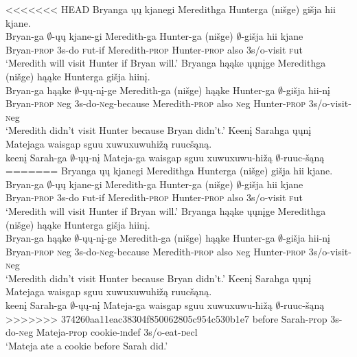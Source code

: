 \documentclass[output=paper]{LSP/langsci}
\begin{document}
\begin{exe}
\ex
\begin{xlist}
\ex
<<<<<<< HEAD
\glll Bryanga ųų kjanegi Meredithga Hunterga (nišge) {gišja hii} kjane.\\
Bryan-ga $\emptyset$-ųų kjane-gi Meredith-ga Hunter-ga (nišge) $\emptyset$-{gišja hii} kjane\\
Bryan-\textsc{prop} {\textsc 3s}-do {\textsc fut}-if Meredith-\textsc{prop} Hunter-\textsc{prop} also {\textsc 3s/o}-visit {\textsc fut}\\
\trans `Meredith will visit Hunter if Bryan will.'
\ex
\glll Bryanga hąąke ųųnįge Meredithga (nišge) hąąke Hunterga {gišja hiinį}.\\
Bryan-ga hąąke $\emptyset$-ųų-nį-ge Meredith-ga (nišge) hąąke Hunter-ga $\emptyset$-{gišja hii-nį}\\
Bryan-\textsc{prop} {\textsc neg} {\textsc 3s}-do-{\textsc neg}-because Meredith-\textsc{prop} also {\textsc neg} Hunter-\textsc{prop} {\textsc 3s/o}-visit-{\textsc neg}\\
\trans `Meredith didn't visit Hunter because Bryan didn't.'
\ex
\glll Keenį Sarahga ųųnį Matejaga {waisgap sguu xuwuxuwuhižą} ruucšąną.\\
keenį Sarah-ga $\emptyset$-ųų-nį Mateja-ga {waisgap sguu xuwuxuwu-hižą} $\emptyset$-ruuc-šąną\\
=======
\glll Bryanga \k{u}\k{u} kjanegi Meredithga Hunterga (ni\v{s}ge) {gi\v{s}ja hii} kjane.\\
Bryan-ga $\emptyset$-\k{u}\k{u} kjane-gi Meredith-ga Hunter-ga (ni\v{s}ge) $\emptyset$-{gi\v{s}ja hii} kjane\\
Bryan-\textsc{prop} {\textsc 3s}-do {\textsc fut}-if Meredith-\textsc{prop} Hunter-\textsc{prop} also {\textsc 3s/o}-visit {\textsc fut}\\
\trans `Meredith will visit Hunter if Bryan will.'
\ex
\glll Bryanga h\k{a}\k{a}ke \k{u}\k{u}n\k{i}ge Meredithga (ni\v{s}ge) h\k{a}\k{a}ke Hunterga {gi\v{s}ja hiin\k{i}}.\\
Bryan-ga h\k{a}\k{a}ke $\emptyset$-\k{u}\k{u}-n\k{i}-ge Meredith-ga (ni\v{s}ge) h\k{a}\k{a}ke Hunter-ga $\emptyset$-{gi\v{s}ja hii-n\k{i}}\\
Bryan-\textsc{prop} {\textsc neg} {\textsc 3s}-do-{\textsc neg}-because Meredith-\textsc{prop} also {\textsc neg} Hunter-\textsc{prop} {\textsc 3s/o}-visit-{\textsc neg}\\
\trans `Meredith didn't visit Hunter because Bryan didn't.'
\ex
\glll Keen\k{i} Sarahga \k{u}\k{u}n\k{i} Matejaga {waisgap sguu xuwuxuwuhi\v{z}\k{a}} ruuc\v{s}\k{a}n\k{a}.\\
keen\k{i} Sarah-ga $\emptyset$-\k{u}\k{u}-n\k{i} Mateja-ga {waisgap sguu xuwuxuwu-hi\v{z}\k{a}} $\emptyset$-ruuc-\v{s}\k{a}n\k{a}\\
>>>>>>> 374260aa11eac38304f850062805c954c530b1e7
before Sarah-{\textsc prop} {\textsc 3s}-do-{\textsc neg} Mateja-{\textsc prop} cookie-{\textsc indef} {\textsc 3s/o}-eat-{\textsc decl}\\
\trans `Mateja ate a cookie before Sarah did.'
\end{xlist}
\end{exe}
\end{document}
